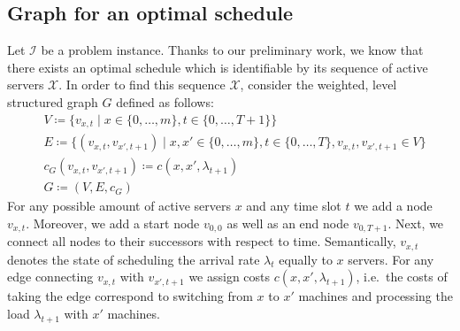 \documentclass[hidelinks]{article}
\theoremstyle{plain}
\theoremstyle{definition}
\theoremstyle{rem}
\newcommand{\mx}{\mathcal{X}}
\newcommand{\inp}{\mathcal{I}}
\newcommand{\costs}{c}
\newcommand{\fromto}[2]{\{#1,\ldots,#2\}}
\begin{document}
\subsection{Graph for an optimal schedule}\label{sec:optgraph}
Let $\inp$ be a problem instance. Thanks to our preliminary work, we know that there exists an optimal schedule which is identifiable by its sequence of active servers $\mx$. In order to find this sequence $\mx$, consider the weighted, level structured graph $G$ defined as follows:
\begin{align*}
	&V\coloneqq\bigl\{v_{x,t}\mid x\in\fromto{0}{m},t\in\fromto{0}{T+1}\bigr\}\\
	&E\coloneqq\bigl\{(v_{x,t},v_{x',t+1})\mid x,x'\in\fromto{0}{m},t\in\fromto{0}{T},v_{x,t},v_{x',t+1}\in V\bigr\}\\
	&c_G(v_{x,t},v_{x',t+1})\coloneqq\costs(x,x',\lambda_{t+1})\\
	&G\coloneqq(V,E,c_G)
\end{align*}
For any possible amount of active servers $x$ and any time slot $t$ we add a node $v_{x,t}$. Moreover, we add a start node $v_{0,0}$ as well as an end node $v_{0,T+1}$. Next, we connect all nodes to their successors with respect to time. Semantically, $v_{x,t}$ denotes the state of scheduling the arrival rate $\lambda_{t}$ equally to $x$ servers. For any edge connecting $v_{x,t}$ with $v_{x',t+1}$ we assign costs $\costs(x,x',\lambda_{t+1})$, i.e.\ the costs of taking the edge correspond to switching from $x$ to $x'$ machines and processing the load $\lambda_{t+1}$ with $x'$ machines.
\end{document}
